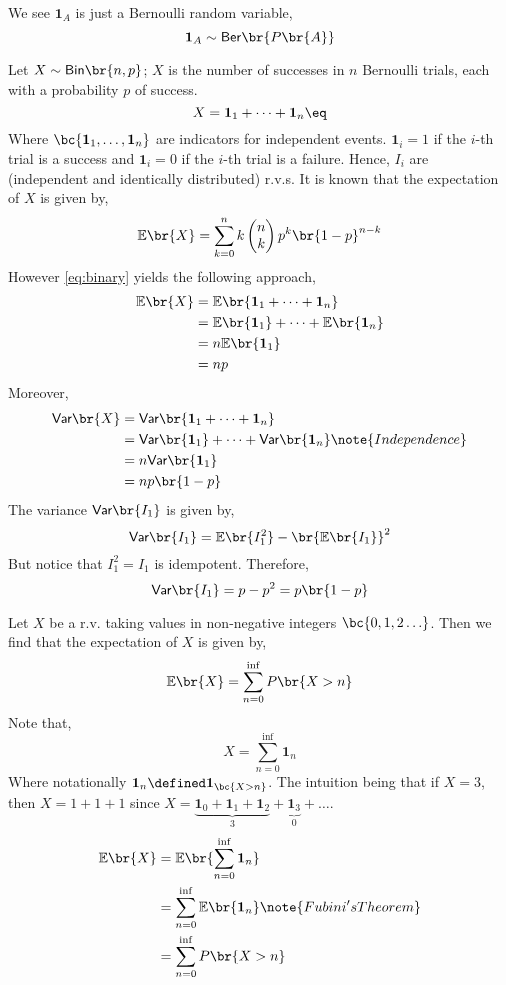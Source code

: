 \documentclass{article}
\newcommand{\Var}{\textsf{Var}}
\newcommand{\Exp}{\mathbb{E}}
\newcommand{\Ber}{\mathsf{Ber}}
\newcommand{\Bi}{\mathsf{Bin}}
\newcommand{\ind}{\mathbf{1}}
\begin{document}
\begin{example}
    We see $\ind_A$ is just a Bernoulli random variable,
    \[ \ind_A \sim \Ber\br{P\br{A}} \]
\end{example}

\begin{example}
    Let $X \sim \Bi\br{n,p}$; $X$ is the number of successes in $n$ Bernoulli trials, each with a probability $p$ of success.
    \[ X = \ind_1 + \cdots + \ind_n \eq \label{eq:binary}\]
    Where $\bc{\ind_1, \ldots, \ind_n}$ are indicators for independent events. $\ind_i = 1$ if the $i$-th trial is a success and $\ind_i = 0$ if the $i$-th trial is a failure. Hence, $I_i$ are  (independent and identically distributed) r.v.s. It is known that the expectation of $X$ is given by,
    \[ \Exp\br{X} = \sum_{k=0}^{n} k \begin{pmatrix}
        n \\ k
    \end{pmatrix} p^k \br{1-p}^{n-k} \]
    However \cref{eq:binary} yields the following approach,
    \begin{align*}
    \Exp\br{X} &= \Exp\br{\ind_1 + \cdots + \ind_n} \\
    &= \Exp\br{\ind_1} + \cdots + \Exp\br{\ind_n} \\
    &= n\Exp\br{\ind_1} \\
    &= np
    \end{align*}
    Moreover,
    \begin{align*}
    \Var\br{X} &= \Var\br{\ind_1 + \cdots + \ind_n} \\
    &= \Var\br{\ind_1} + \cdots + \Var\br{\ind_n} \note{Independence}\\
    &= n\Var\br{\ind_1} \\
    &= np\br{1-p}
    \end{align*}
    The variance $\Var\br{I_1}$ is given by,
    \[ \Var\br{I_1} = \Exp\br{I_1^2} - \br{\Exp\br{I_1}}^2 \]
    But notice that $I_1^2 = I_1$ is idempotent. Therefore,
    \[ \Var\br{I_1} = p - p^2 = p\br{1-p} \]
\end{example}
\begin{example}
    Let $X$ be a r.v. taking values in non-negative integers $\bc{0,1,2\ldots}$. Then we find that the expectation of $X$ is given by,
    \[ \Exp\br{X} = \sum_{n=0}^{\inf} P\br{X > n} \]
    Note that,
    \[ X = \sum_{n=0}^{\inf} \ind_n \]
    Where notationally $\ind_n \defined \ind_{\bc{X > n}}$. The intuition being that if $X = 3$, then $X = 1 + 1 + 1$ since $X = \underbrace{\ind_0 + \ind_1 + \ind_2}_3 + \underbrace{\ind_3}_0 + \ldots$.
    \begin{align*}
        \Exp\br{X} &= \Exp\br{\sum_{n=0}^{\inf} \ind_n} \\
        &= \sum_{n=0}^{\inf}\Exp\br{\ind_n} \note{Fubini's Theorem} \\
        &= \sum_{n=0}^{\inf}P\br{X > n} \\
    \end{align*}
\end{example}
\end{document}
